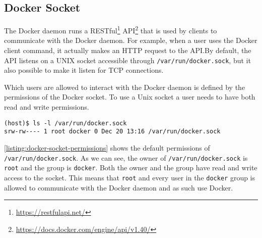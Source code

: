 \subsection{Docker Socket}\label{background:docker-socket}
The Docker daemon runs a RESTful\footnote{\url{https://restfulapi.net/}} API\footnote{\url{https://docs.docker.com/engine/api/v1.40/}} that is used by clients to communicate with the Docker daemon. For example, when a user uses the Docker client command, it actually makes an HTTP request to the API.\@ By default, the API listens on a UNIX socket accessible through \lstinline{/var/run/docker.sock}, but it also possible to make it listen for TCP connections.

\medskip

Which users are allowed to interact with the Docker daemon is defined by the permissions of the Docker socket. To use a Unix socket a user needs to have both read and write permissions.

\begin{lstlisting}[caption={Default Docker socket permissions.},captionpos=b,label={listing:docker-socket-permissions}]
(host)$ ls -l /var/run/docker.sock
srw-rw---- 1 root docker 0 Dec 20 13:16 /var/run/docker.sock
\end{lstlisting}

\autoref{listing:docker-socket-permissions} shows the default permissions of \lstinline{/var/run/docker.sock}. As we can see, the owner of \lstinline{/var/run/docker.sock} is \lstinline{root} and the group is \lstinline{docker}. Both the owner and the group have read and write access to the socket. This means that \lstinline{root} and every user in the \lstinline{docker} group is allowed to communicate with the Docker daemon and as such use Docker.
